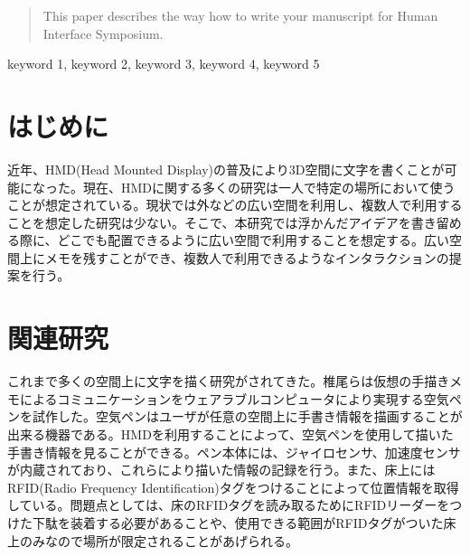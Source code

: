 \documentclass{hissymp}
\begin{document}

\begin{abstract}
This paper describes the way how to write your manuscript for Human Interface Symposium.
\end{abstract}

\begin{keyword}	
keyword 1, keyword 2, keyword 3, keyword 4, keyword 5
\end{keyword}

\maketitle	

\section{はじめに}
近年、HMD(Head Mounted Display)の普及により3D空間に文字を書くことが可能になった。現在、HMDに関する多くの研究は一人で特定の場所において使うことが想定されている。現状では外などの広い空間を利用し、複数人で利用することを想定した研究は少ない。そこで、本研究では浮かんだアイデアを書き留める際に、どこでも配置できるように広い空間で利用することを想定する。広い空間上にメモを残すことができ、複数人で利用できるようなインタラクションの提案を行う。


\section{関連研究}
これまで多くの空間上に文字を描く研究がされてきた。椎尾ら\cite{tex1,tex2}は仮想の手描きメモによるコミュニケーションをウェアラブルコンピュータにより実現する空気ペンを試作した。空気ペンはユーザが任意の空間上に手書き情報を描画することが出来る機器である。HMDを利用することによって、空気ペンを使用して描いた手書き情報を見ることができる。ペン本体には、ジャイロセンサ、加速度センサが内蔵されており、これらにより描いた情報の記録を行う。また、床上にはRFID(Radio Frequency Identification)タグをつけることによって位置情報を取得している。問題点としては、床のRFIDタグを読み取るためにRFIDリーダーをつけた下駄を装着する必要があることや、使用できる範囲がRFIDタグがついた床上のみなので場所が限定されることがあげられる。
\end{document}
